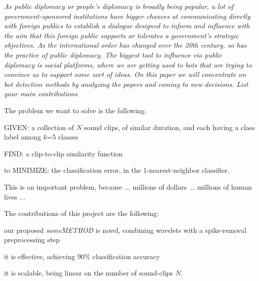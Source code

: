 {\small \em As public diplomacy or people's diplomacy is broadly being popular, a lot of government-sponsored institutions have bigger chances at communicating directly with foreign publics to establish a dialogue designed to inform and influence with the aim that this foreign public supports or tolerates a government’s strategic objectives. As the international order has changed over the 20th century, so has the practice of public diplomacy. The biggest tool to influence via public diplomacy is social platforms, where we are getting used to bots that are trying to convince us to support some sort of ideas. On this paper we will concentrate on bot detection methods by analyzing the papers and coming to new decisions.  
List your main contributions}

The problem we want to solve is the following:
\bit
\item GIVEN: a collection of $N$ sound clips, of similar duration,
      and each having a class label among $k$=5 classes
\item FIND: a clip-to-clip similarity function
\item to MINIMIZE: the classification error, in the 1-nearest-neighbor
      classifier.
\eit

This is an important problem, because $\ldots$
millions of dollars $\ldots$
millions of human lives $\ldots$

The contributions of this project are the following:
\bit
\item our proposed {\em someMETHOD} is novel, combining wavelets
      with a spike-removal  preprocessing step
\item it is effective, achieving 90\% classification accuracy
\item it is scalable, being linear on the number of sound-clips $N$.
\eit
